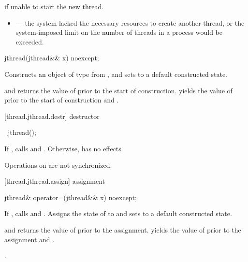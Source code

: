 \begin{itemdescr}
\pnum\throws {} if unable to start the new thread.

\pnum\errors
\begin{itemize}
\item {} --- the system lacked the necessary
resources to create another thread, or the system-imposed limit on the number of
threads in a process would be exceeded.
\end{itemize}
\end{itemdescr}

%
\begin{itemdecl}
jthread(jthread&& x) noexcept;
\end{itemdecl}

\begin{itemdescr}
\pnum
\effects Constructs an object of type  from , and sets
 to a default constructed state.

\pnum
\postconditions {} and  returns the
value of  prior to the start of construction.
{\color{insertnote}
 yields the value of  prior to the start of construction
and .
}%

\end{itemdescr}

[thread.jthread.destr]{ destructor}

%
\begin{itemdecl}
~jthread();
\end{itemdecl}

{\color{insertnote}
\begin{itemdescr}
\pnum
If , calls  and .
Otherwise, has no effects.
\begin{note} Operations on  are not synchronized. \end{note}
\end{itemdescr}
}%

[thread.jthread.assign]{ assignment}

%
\begin{itemdecl}
jthread& operator=(jthread&& x) noexcept;
\end{itemdecl}

\begin{itemdescr}
\pnum
\effects If , calls  and .
Assigns the
state of  to  and sets  to a default constructed state.

{\color{insertnote}
\pnum
\postconditions {} and  returns the value of
 prior to the assignment.
 yields the value of  prior to the assignment
and .
}%

\pnum
\returns {}.
\end{itemdescr}


